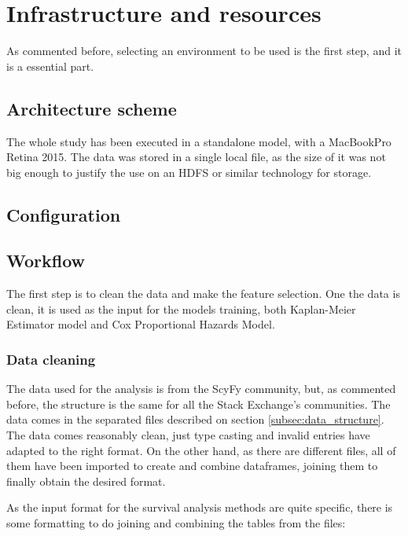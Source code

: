 \documentclass[11pt]{article} %
\begin{document}
\section{Infrastructure and resources}
  \label{sec:infrastructure_and_resources}

  As commented before, selecting an environment to be used is the first step, and it is a essential part.

  \subsection{Architecture scheme}

    The whole study has been executed in a standalone model, with a MacBookPro Retina 2015. The data was stored in a single local file, as the size of it was not big enough to justify the use on an HDFS or similar technology for storage.

  \subsection{Configuration}



  \subsection{Workflow}

    The first step is to clean the data and make the feature selection. One the data is clean, it is used as the input for the models training, both Kaplan-Meier Estimator model and Cox Proportional Hazards Model.




  \subsubsection{Data cleaning}

    The data used for the analysis is from the ScyFy community, but, as commented before, the structure is the same for all the Stack Exchange's communities. The data comes in the separated files described on section \ref{subsec:data_structure}. The data comes reasonably clean, just type casting and invalid entries have adapted to the right format. On the other hand, as there are different files, all of them have been imported to create and combine dataframes, joining them to finally obtain the desired format.

    As the input format for the survival analysis methods are quite specific, there is some formatting to do joining and combining the tables from the files:
\end{document}
